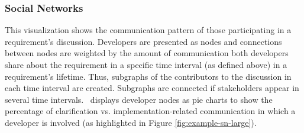 \subsubsection{Social Networks} 
This visualization shows the communication pattern of those participating in a requirement's discussion. 
Developers are presented as nodes and connections between nodes are weighted by the amount of communication both developers share about the requirement in a specific time interval (as defined above) in a requirement's lifetime. 
Thus, subgraphs of the contributors to the discussion in each time interval are created.
Subgraphs are connected if  stakeholders appear in several time intervals. 
\viss\ displays developer nodes as pie charts to show the percentage of clarification vs. implementation-related communication in which a developer is involved (as highlighted in Figure \ref{fig:example-sn-large}).





